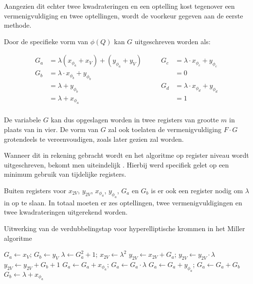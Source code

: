 Aangezien dit echter twee kwadrateringen en een optelling kost tegenover een vermenigvuldiging en twee optellingen, wordt de voorkeur gegeven aan de eerste methode.

Door de specifieke vorm van $\phi(Q)$ kan $G$ uitgeschreven worden als:

\[\begin{aligned}
	G_a	&=	\lambda (x_{\phi_a} + x_V) + (y_{\phi_a} + y_V)\qquad&
				G_c	&= \lambda \cdot x_{\phi_c} + y_{\phi_c}\\
	G_b	&=	\lambda \cdot x_{\phi_b} + y_{\phi_b}&
						&= 0\\
			&= \lambda + y_{\phi_b}&
				G_d	&= \lambda \cdot x_{\phi_d} + y_{\phi_d}\\
			&=	\lambda + x_{\phi_a}&
						&= 1\\
\end{aligned}\]

De variabele $G$ kan dus opgeslagen worden in twee registers van grootte $m$ in plaats van in vier. De vorm van $G$ zal ook toelaten de vermenigvuldiging $F \cdot G$ grotendeels te vereenvoudigen, zoals later gezien zal worden.

Wanneer dit in rekening gebracht wordt en het algoritme op register niveau wordt uitgeschreven, bekomt men uiteindelijk . Hierbij werd specifiek gelet op een minimum gebruik van tijdelijke registers.

Buiten registers voor $x_{2V}$, $y_{2V}$, $x_{\phi_a}$, $y_{\phi_a}$, $G_a$ en $G_b$ is er ook een register nodig om $\lambda$ in op te slaan. In totaal moeten er zes optellingen, twee vermenigvuldigingen en twee kwadrateringen uitgerekend worden.


\begin{algorithm}[h]
	\caption{Uitwerking van de verdubbelingstap voor hyperelliptische krommen in het Miller algoritme}
	\label{algoritme-implementatie-miller-double-detail}
	$G_a \leftarrow x_V$; $G_b \leftarrow y_V$\;
	$\lambda \leftarrow G_a^2 + 1$; $x_{2V} \leftarrow \lambda ^2$\;
	$y_{2V} \leftarrow x_{2V} + G_a$; $y_{2V} \leftarrow y_{2V} \cdot \lambda$\;
	$y_{2V} \leftarrow y_{2V} + G_b + 1$\;
	$G_a \leftarrow G_a + x_{\phi_a}$; $G_a \leftarrow G_a \cdot \lambda$\;
	$G_a \leftarrow G_a + y_{\phi_a}$; $G_a \leftarrow G_a + G_b$\;
	$G_b \leftarrow \lambda + x_{\phi_a}$\;
\end{algorithm}

